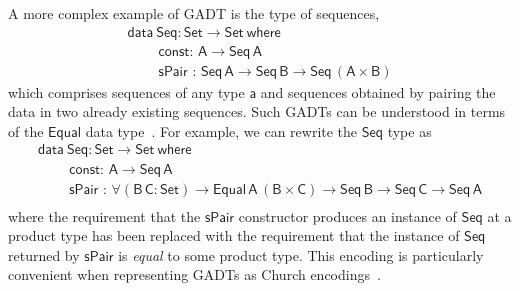 \documentclass[9pt]{entcs} \usepackage{entcsmacro}
\begin{document}
\begin{example}\label{example:seq}
A more complex example of GADT is the type of sequences,
\begin{equation}\label{eq:eq-seq}
\begin{array}{l}
\mathsf{data\ Seq : Set \to Set\ where}\\
\mathsf{\;\;\;\;\;\;\;\;const :\, A \to Seq\,A}\\
\mathsf{\;\;\;\;\;\;\;\;sPair\,\, :\, Seq\,A \to Seq\,B \to Seq\,(A \times B)}
\end{array}
\end{equation}
which comprises sequences of any type $\mathsf{a}$
and sequences obtained by pairing the data in two already existing sequences.
Such GADTs can be understood in terms of the $\mathsf{Equal}$ data type~\cite{ch03,sp04}.
For example, we can rewrite the $\mathsf{Seq}$ type as
\begin{equation}\label{eq:eq_seq}
\begin{array}{l}
\mathsf{data\ Seq : Set \to Set\ where}\\
\mathsf{\;\;\;\;\;\;\;\;const :\, A \to Seq\,A}\\
\mathsf{\;\;\;\;\;\;\;\;sPair\,\, :\, \forall (B\,C : Set) \to Equal\,A\,(B \times C)
  \to Seq\,B \to Seq\,C \to Seq\,A}\\ 
\end{array}
\end{equation}
where the requirement that the $\mathsf{sPair}$ constructor produces an instance of $\mathsf{Seq}$ at a product type has been replaced with the requirement that the instance of $\mathsf{Seq}$ returned by $\mathsf{sPair}$ is \emph{equal} to some product type.
This encoding is particularly convenient when representing GADTs as Church encodings~\cite{vw10,atk12}.
\end{example}

\end{document}
